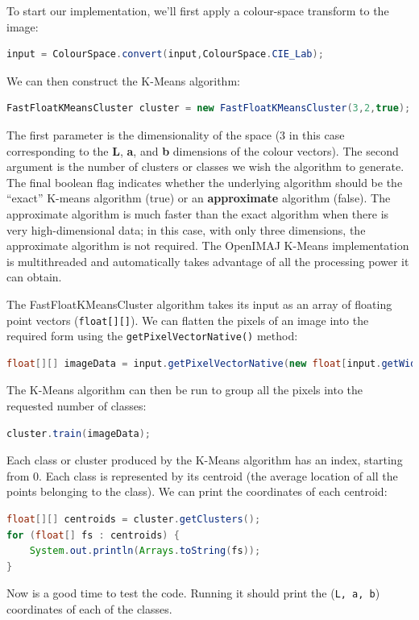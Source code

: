 \pagebreak
To start our implementation, we'll first apply a colour-space transform to the image:
\begin{lstlisting}[language=java]
input = ColourSpace.convert(input,ColourSpace.CIE_Lab);
\end{lstlisting}
We can then construct the K-Means algorithm:
\begin{lstlisting}[language=java]
FastFloatKMeansCluster cluster = new FastFloatKMeansCluster(3,2,true);
\end{lstlisting}
The first parameter is the dimensionality of the space (3 in this case corresponding 
to the \textbf{L}, \textbf{a}, and \textbf{b} dimensions of the colour vectors). The second 
argument is the number of clusters or classes we wish the algorithm to generate. The final 
boolean flag indicates whether the underlying algorithm should be the ``exact'' K-means algorithm (true) or an 
\textbf{approximate} algorithm (false). The approximate algorithm is much faster than the exact 
algorithm when there is very high-dimensional data; in this case, with only three dimensions, 
the approximate algorithm is not required. The OpenIMAJ K-Means implementation is 
multithreaded and automatically takes advantage of all the processing power it can obtain.

The FastFloatKMeansCluster algorithm takes its input as an array of floating point vectors
(\verb+float[][]+). We can flatten the pixels of an image into the required form using the 
\verb+getPixelVectorNative()+ method:
\begin{lstlisting}[language=java]
float[][] imageData = input.getPixelVectorNative(new float[input.getWidth() * input.getHeight()][3]);
\end{lstlisting}
The K-Means algorithm can then be run to group all the pixels into the requested number of classes:
\begin{lstlisting}[language=java]
cluster.train(imageData);
\end{lstlisting}
Each class or cluster produced by the K-Means algorithm has an index, starting from 0. Each class is 
represented by its centroid (the average location of all the points belonging to the class). We can 
print the coordinates of each centroid:
\begin{lstlisting}[language=java]
float[][] centroids = cluster.getClusters();
for (float[] fs : centroids) {
    System.out.println(Arrays.toString(fs));
}
\end{lstlisting}
Now is a good time to test the code. Running it should print the (\verb+L, a, b+) coordinates of each 
of the classes.

